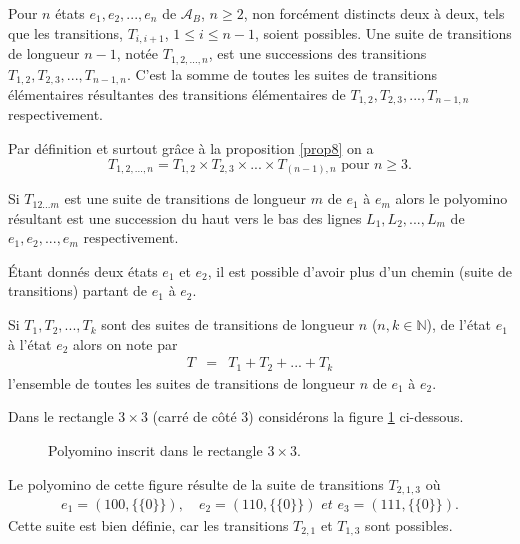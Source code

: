 \begin{Def}\label{defst}
Pour $n$ états $e_{1}, e_{2},...,e_{n}$  de $\mathcal{A}_{B}$, $n\geq 2$, non forcément distincts deux à deux, tels que les transitions, $T_{i,i+1}$, $1\leq i \leq n-1$, soient possibles. Une suite de transitions de longueur $n-1$, notée $T_{1,2,...,n}$,  est une successions des transitions $T_{1,2},  T_{2,3}, ..., T_{n-1,n}$.  C'est la somme de toutes les suites de transitions élémentaires résultantes des transitions élémentaires de $T_{1,2},  T_{2,3}, ..., T_{n-1,n}$  respectivement.
\end{Def}
Par définition et surtout grâce à la  proposition \ref{prop8} on a
$$T_{1,2,...,n}= T_{1,2}\times T_{2,3}\times...\times T_{(n-1),n} \text{ pour } n\geq 3. $$



\begin{Rem}\label{rem5}
Si $T_{12...m}$ est une suite de transitions de longueur $m$ de $e_{1}$ à $e_{m}$ alors le polyomino résultant est une succession du haut vers le bas des lignes $L_{1}, L_{2},...,L_{m}$ de $e_{1}, e_{2},...,e_{m}$ respectivement. %

Étant donnés deux états $e_{1}$ et $e_{2}$, il est possible d'avoir plus d'un chemin (suite de transitions) partant de  $e_{1}$ à $e_{2}$.

Si $T_{1}, T_{2},...,T_{k}$ sont des suites de transitions de longueur $n$   ($n,k\in\mathbb{N}$), de l'état $e_{1}$ à l'état $e_{2}$ alors on note par 
\begin{eqnarray}\label{notf}
T &=& T_{1}+T_{2}+...+ T_{k}
\end{eqnarray}
l'ensemble de toutes les suites de transitions de longueur $n$ de $e_{1}$ à $e_{2}$.
\end{Rem}
\begin{Ex}\label{ex8}
Dans le rectangle $3\times 3$ (carré de côté $3$) considérons la figure \ref{Atfig10} ci-dessous.
\begin{figure}[!htb]
\begin{minipage}[c]{.16\linewidth}
        \centering
\end{minipage}\hfill
\begin{minipage}[c]{.56\linewidth}
        \centering
\begin{logicpuzzle}[rows=3,columns=3,color=cyan!100, width=750px,scale=0.5]
\framepuzzle[black!50]
\end{logicpuzzle}
\end{minipage}
\caption{\label{Atfig10} Polyomino inscrit dans le rectangle $3\times 3$.}
\end{figure} 
Le polyomino de cette figure résulte de la suite de transitions $T_{2,1,3}$ où
\begin{eqnarray*}
e_{1} = (100,\{\{0\}\}), \quad e_{2}=(110,\{\{0\}\})\textit{  et  } e_{3}=(111,\{\{0\}\}).
\end{eqnarray*}
Cette suite est bien définie, car les transitions $T_{2,1}$ et $T_{1,3}$ sont possibles.
\end{Ex}
